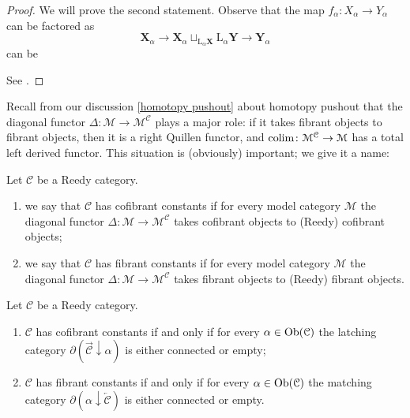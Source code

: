 \begin{refsection}
\begin{proof}
We will prove the second statement. Observe that the map $f_\alpha \colon X_\alpha \to Y_\alpha$ can be factored as
\[
\mathbf X_\alpha \to \mathbf X_\alpha \sqcup_{\mathrm L_\alpha \mathbf X} \mathrm L_\alpha \mathbf Y \to \mathbf Y_\alpha
\]
can be

See \cite[Proposition 15.3.11]{hirschhorn}.
\end{proof}

Recall from our discussion \ref{homotopy pushout} about homotopy pushout that the diagonal functor $\Delta \colon \mathcal M \to \mathcal M^{\mathcal C}$ plays a major role: if it takes fibrant objects to fibrant objects, then it is a right Quillen functor, and $\operatorname*{colim} \colon \mathcal M^{\mathcal C} \to \mathcal M$ has a total left derived functor. This situation is (obviously) important; we give it a name:

\begin{defin} \label{def reedy cofibrant constants}
Let $\mathcal C$ be a Reedy category.
\begin{enumerate}
\item we say that $\mathcal C$ has cofibrant constants if for every model category $\mathcal M$ the diagonal functor $\Delta \colon \mathcal M \to \mathcal M^{\mathcal C}$ takes cofibrant objects to (Reedy) cofibrant objects;
\item we say that $\mathcal C$ has fibrant constants if for every model category $\mathcal M$ the diagonal functor $\Delta \colon \mathcal M \to \mathcal M^{\mathcal C}$ takes fibrant objects to (Reedy) fibrant objects.
\end{enumerate}
\end{defin}

\begin{prop} \label{prop reedy cofibrant constants}
Let $\mathcal C$ be a Reedy category.
\begin{enumerate}
\item $\mathcal C$ has cofibrant constants if and only if for every $\alpha \in \operatorname{Ob}(\mathcal C)$ the latching category $\partial (\overrightarrow{\mathcal C} \downarrow \alpha)$ is either connected or empty;
\item $\mathcal C$ has fibrant constants if and only if for every $\alpha \in \operatorname{Ob}(\mathcal C)$ the matching category $\partial (\alpha \downarrow \overleftarrow{\mathcal C} )$ is either connected or empty.
\end{enumerate}
\end{prop}


\end{refsection}
